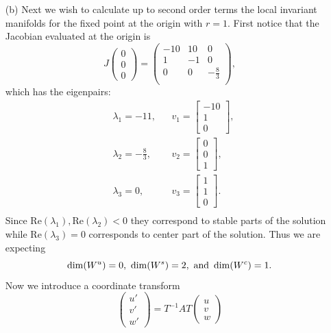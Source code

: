 \documentclass[12pt]{report}
\begin{document}
\begin{solution}
\begin{enumerate}
        \item [(b)]
        Next we wish to calculate up to second order terms the local invariant manifolds for the fixed point at the origin with $r=1$. First notice that the Jacobian evaluated at the origin is
        \[ 
            J\begin{pmatrix}
                0\\0\\0
            \end{pmatrix} = \left(
\begin{array}{ccc}
 -10 & 10 & 0 \\
 1 & -1 & 0 \\
 0 & 0 & -\frac{8}{3} \\
\end{array}
\right),
        \]
        which has the eigenpairs:
        \begin{align*}
            &\lambda_1 = -11, &&v_1 = \begin{bmatrix}
                -10\\1\\0
            \end{bmatrix},\\
            &\lambda_2 = -\frac{8}{3}, &&v_2 = \begin{bmatrix}
                0\\0\\1
            \end{bmatrix},\\
            &\lambda_3 = 0, &&v_3 = \begin{bmatrix}
                1\\1\\0
            \end{bmatrix}.\\
        \end{align*}
        Since $\text{Re}(\lambda_1),\text{Re}(\lambda_2) < 0$ they correspond to stable parts of the solution while $\text{Re}(\lambda_3) = 0$ corresponds to center part of the solution. Thus we are expecting \[\dim(W^u) = 0,~ \dim(W^s) = 2, {~\text{and}~} \dim(W^c) = 1.\] 
        Now we introduce a coordinate transform
        \[ 
            \begin{pmatrix}
                u'\\v'\\w'
            \end{pmatrix} = T^{-1}AT \begin{pmatrix}
                u\\v\\w

\end{pmatrix}\]
\end{enumerate}
\end{solution}
\end{document}
